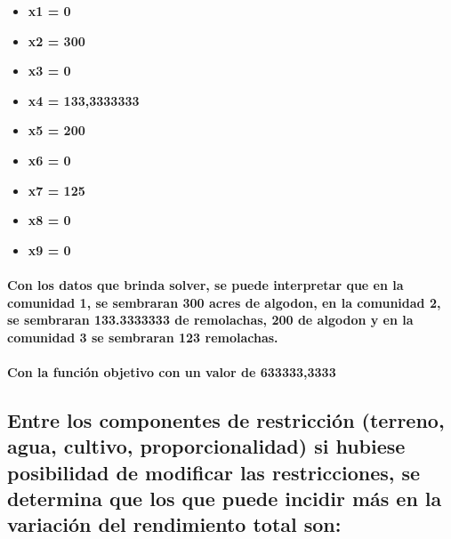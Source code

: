 \documentclass[
]{article}
\providecommand{\tightlist}{%
  \setlength{\itemsep}{0pt}\setlength{\parskip}{0pt}}
\begin{document}
\begin{itemize}
\tightlist
\item
  \textbf{x1 = 0}
\item
  \textbf{x2 = 300}
\item
  \textbf{x3 = 0}
\item
  \textbf{x4 = 133,3333333}
\item
  \textbf{x5 = 200}
\item
  \textbf{x6 = 0}
\item
  \textbf{x7 = 125}
\item
  \textbf{x8 = 0}
\item
  \textbf{x9 = 0}
\end{itemize}

\hypertarget{con-los-datos-que-brinda-solver-se-puede-interpretar-que-en-la-comunidad-1-se-sembraran-300-acres-de-algodon-en-la-comunidad-2-se-sembraran-133.3333333-de-remolachas-200-de-algodon-y-en-la-comunidad-3-se-sembraran-123-remolachas.}{%
\paragraph{Con los datos que brinda solver, se puede interpretar que en
la comunidad 1, se sembraran 300 acres de algodon, en la comunidad 2, se
sembraran 133.3333333 de remolachas, 200 de algodon y en la comunidad 3
se sembraran 123
remolachas.}\label{con-los-datos-que-brinda-solver-se-puede-interpretar-que-en-la-comunidad-1-se-sembraran-300-acres-de-algodon-en-la-comunidad-2-se-sembraran-133.3333333-de-remolachas-200-de-algodon-y-en-la-comunidad-3-se-sembraran-123-remolachas.}}

\hypertarget{con-la-funciuxf3n-objetivo-con-un-valor-de-6333333333}{%
\paragraph{\texorpdfstring{Con la función objetivo con un valor de
\textbf{633333,3333}}{Con la función objetivo con un valor de 633333,3333}}\label{con-la-funciuxf3n-objetivo-con-un-valor-de-6333333333}}

\hypertarget{entre-los-componentes-de-restricciuxf3n-terreno-agua-cultivo-proporcionalidad-si-hubiese-posibilidad-de-modificar-las-restricciones-se-determina-que-los-que-puede-incidir-muxe1s-en-la-variaciuxf3n-del-rendimiento-total-son}{%
\subsection{Entre los componentes de restricción (terreno, agua,
cultivo, proporcionalidad) si hubiese posibilidad de modificar las
restricciones, se determina que los que puede incidir más en la
variación del rendimiento total
son:}\label{entre-los-componentes-de-restricciuxf3n-terreno-agua-cultivo-proporcionalidad-si-hubiese-posibilidad-de-modificar-las-restricciones-se-determina-que-los-que-puede-incidir-muxe1s-en-la-variaciuxf3n-del-rendimiento-total-son}}
\end{document}
